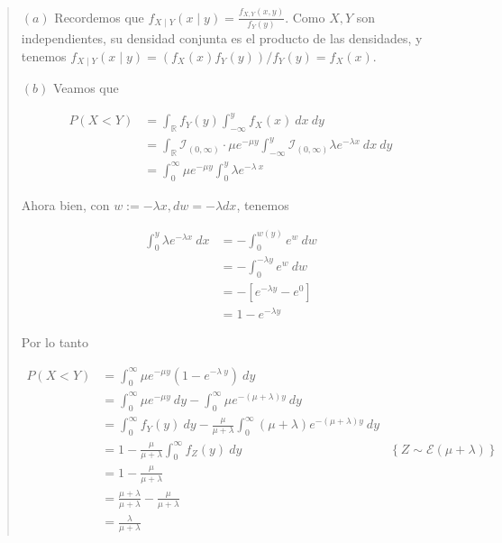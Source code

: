 \documentclass[a4paper, 12pt]{article}
\begin{document}
\small
\begin{quote}

  $(a)$ Recordemos que $f_{X \mid Y}(x \mid y) = \frac{f_{X, Y}(x,
  y)}{f_Y(y)}$. Como $X, Y$ son independientes, su densidad conjunta es el
  producto de las densidades, y tenemos $f_{X \mid Y}(x \mid y) = (f_X(x)
  f_Y(y))/f_Y(y) = f_X(x)$.

  $(b)$ Veamos que

  \begin{align*}
    P(X < Y) 
    &= \int_{\mathbb{R}} f_Y(y) \int_{-\infty}^y f_X(x) ~ dx ~ dy \\ 
    &=\int_\mathbb{R} \mathcal{I}_{(0, \infty)} \cdot \mu e^{-\mu y}
    \int_{-\infty}^y \mathcal{I}_{(0, \infty)} \lambda e^{-\lambda x} ~ dx ~ dy
    \\ 
    &=\int_0^\infty \mu e^{-\mu y}\int_0^y \lambda e^{-\lambda ~ x}
  \end{align*}

Ahora bien, con $w := -\lambda x, dw = -\lambda dx$, tenemos

\begin{align*}
  \int_0^y \lambda e^{-\lambda x} ~ dx 
  &= -\int_0^{w(y)}  e^w ~ dw \\ 
  &=-\int_0^{-\lambda y} e^w ~ dw \\ 
  &= - \left[ e^{-\lambda y} - e^0 \right] \\ 
  &=1 - e^{- \lambda y}
\end{align*}

Por lo tanto

\begin{align*}
P(X < Y) 
  &= \int_0^\infty \mu e^{-\mu y} \left( 1 - e^{-\lambda ~ y} \right) ~ dy \\ 
  &= \int_0^\infty \mu e^{-\mu y} ~ dy - \int_0^\infty \mu e^{-(\mu + \lambda) y
  } ~ dy \\ 
  &= \int_0^\infty f_{Y}(y) ~ dy - \frac{\mu}{\mu + \lambda}\int_0^\infty (\mu +
  \lambda)e^{-(\mu + \lambda) y} ~ dy \\ 
  &= 1 - \frac{\mu}{\mu + \lambda} \int_0^\infty f_{Z}(y) ~ dy &\left\{ Z \sim
  \mathcal{E}(\mu + \lambda) \right\}  \\ 
  &= 1 - \frac{\mu}{\mu + \lambda} \\ 
  &= \frac{\mu + \lambda}{\mu + \lambda} - \frac{\mu}{\mu + \lambda} \\ 
  &= \frac{\lambda}{\mu + \lambda}
\end{align*}


\end{quote}
\normalsize
\end{document}
